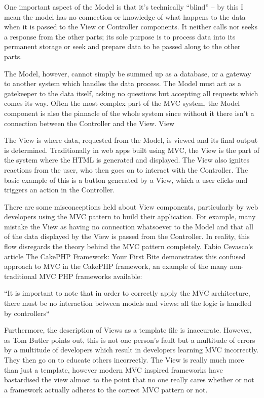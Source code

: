 \documentclass[a4paper,openany,twoside,final]{book}
\begin{document}
One important aspect of the Model is that it’s technically “blind” – by this I mean the model has no connection or knowledge of what happens to the data when it is passed to the View or Controller components. It neither calls nor seeks a response from the other parts; its sole purpose is to process data into its permanent storage or seek and prepare data to be passed along to the other parts.

The Model, however, cannot simply be summed up as a database, or a gateway to another system which handles the data process. The Model must act as a gatekeeper to the data itself, asking no questions but accepting all requests which comes its way. Often the most complex part of the MVC system, the Model component is also the pinnacle of the whole system since without it there isn’t a connection between the Controller and the View.
View

The View is where data, requested from the Model, is viewed and its final output is determined. Traditionally in web apps built using MVC, the View is the part of the system where the HTML is generated and displayed. The View also ignites reactions from the user, who then goes on to interact with the Controller. The basic example of this is a button generated by a View, which a user clicks and triggers an action in the Controller.

There are some misconceptions held about View components, particularly by web developers using the MVC pattern to build their application. For example, many mistake the View as having no connection whatsoever to the Model and that all of the data displayed by the View is passed from the Controller. In reality, this flow disregards the theory behind the MVC pattern completely. Fabio Cevasco’s article The CakePHP Framework: Your First Bite demonstrates this confused approach to MVC in the CakePHP framework, an example of the many non-traditional MVC PHP frameworks available:

    “It is important to note that in order to correctly apply the MVC architecture, there must be no interaction between models and views: all the logic is handled by controllers“

Furthermore, the description of Views as a template file is inaccurate. However, as Tom Butler points out, this is not one person’s fault but a multitude of errors by a multitude of developers which result in developers learning MVC incorrectly. They then go on to educate others incorrectly. The View is really much more than just a template, however modern MVC inspired frameworks have bastardised the view almost to the point that no one really cares whether or not a framework actually adheres to the correct MVC pattern or not.
\end{document}
